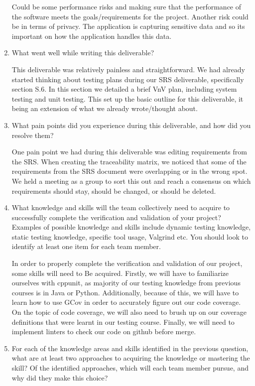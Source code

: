 \documentclass[12pt, titlepage]{article}
\begin{document}
\begin{enumerate}
Could be some performance risks and making sure that the performance of the software meets the goals/requirements for the project.
Another risk could be in terms of privacy. The application is capturing sensitive data and so its important on how the application handles this data.

\item What went well while writing this deliverable?

This deliverable was relatively painless and straightforward. We had already started thinking about testing plans
during our SRS deliverable, specifically section S.6. In this section we detailed a brief VnV plan, including system testing
and unit testing. This set up the basic outline for this deliverable, it being an extension of what we already wrote/thought about.

\item What pain points did you experience during this deliverable, and how
  did you resolve them?

One pain point we had during this deliverable was editing requirements from the SRS. When creating the traceability matrix, we noticed
that some of the requirements from the SRS document were overlapping or in the wrong spot. We held a meeting as a group to sort this out 
and reach a consensus on which requirements should stay, should be changed, or should be deleted.

\item What knowledge and skills will the team collectively need to acquire to
successfully complete the verification and validation of your project?
Examples of possible knowledge and skills include dynamic testing knowledge,
static testing knowledge, specific tool usage, Valgrind etc.  You should look to
identify at least one item for each team member.

In order to properly complete the verification and validation of our project, some skills will need to Be
acquired. Firstly, we will have to familiarize ourselves with cppunit, as majority of our testing knowledge from
previous courses is in Java or Python. Additionally, because of this, we will have to learn how to use GCov in order to
accurately figure out our code coverage. On the topic of code coverage, we will also need to brush up on our coverage 
definitions that were learnt in our testing course. Finally, we will need to implement linters to check our code on github
before merge.

\item For each of the knowledge areas and skills identified in the previous
question, what are at least two approaches to acquiring the knowledge or
mastering the skill?  Of the identified approaches, which will each team
member pursue, and why did they make this choice?


\end{enumerate}
\end{document}
